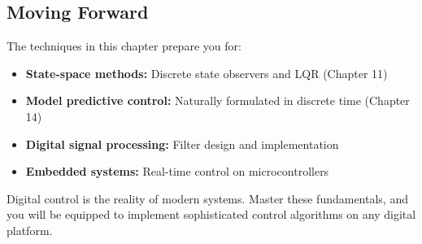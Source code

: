 \subsection{Moving Forward}

The techniques in this chapter prepare you for:
\begin{itemize}
    \item \textbf{State-space methods:} Discrete state observers and LQR (Chapter 11)
    \item \textbf{Model predictive control:} Naturally formulated in discrete time (Chapter 14)
    \item \textbf{Digital signal processing:} Filter design and implementation
    \item \textbf{Embedded systems:} Real-time control on microcontrollers
\end{itemize}

Digital control is the reality of modern systems. Master these fundamentals, and you will be equipped to implement sophisticated control algorithms on any digital platform.

